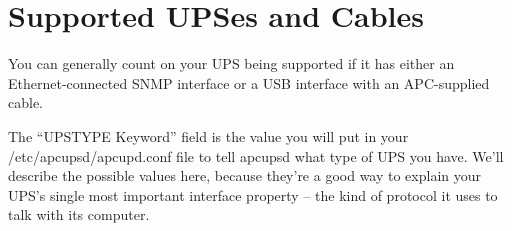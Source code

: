 \label{Supported-UPSes}
\section*{Supported UPSes and Cables}

You can generally count on your UPS being supported if it has either an
Ethernet-connected SNMP interface or a USB interface with an APC-supplied
cable.  

\label{upstypes}
The ``UPSTYPE Keyword'' field is the value you will put in your
/etc/apcupsd/apcupd.conf file to tell apcupsd what type of UPS you have. 
We'll describe the possible values here, because they're a good way to explain
your UPS's single most important interface property {--} the kind of protocol
it uses to talk with its computer.  

\label{index-UPSTYPE-10}
\label{index-Keywords_002c-USBTYPE-11}

